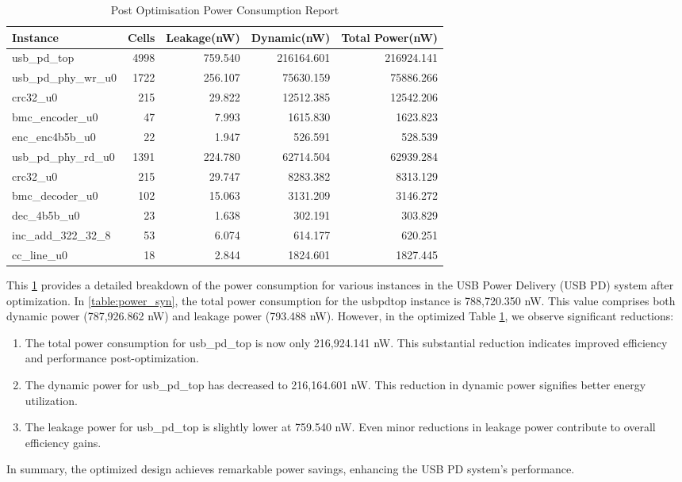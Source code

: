 \begin{table}[H]
\centering
\caption{Post Optimisation Power Consumption Report}
\begin{tabular}{|l|r|r|r|r|}
\hline
\textbf{Instance} & \textbf{Cells} & \textbf{Leakage(nW)} & \textbf{Dynamic(nW)} & \textbf{Total Power(nW)} \\ \hline
usb\_pd\_top & 4998 & 759.540 & 216164.601 & 216924.141 \\ \hline
\quad usb\_pd\_phy\_wr\_u0 & 1722 & 256.107 & 75630.159 & 75886.266 \\ \hline
\quad \quad crc32\_u0 & 215 & 29.822 & 12512.385 & 12542.206 \\ \hline
\quad \quad bmc\_encoder\_u0 & 47 & 7.993 & 1615.830 & 1623.823 \\ \hline
\quad \quad enc\_enc4b5b\_u0 & 22 & 1.947 & 526.591 & 528.539 \\ \hline
\quad usb\_pd\_phy\_rd\_u0 & 1391 & 224.780 & 62714.504 & 62939.284 \\ \hline
\quad \quad crc32\_u0 & 215 & 29.747 & 8283.382 & 8313.129 \\ \hline
\quad \quad bmc\_decoder\_u0 & 102 & 15.063 & 3131.209 & 3146.272 \\ \hline
\quad \quad dec\_4b5b\_u0 & 23 & 1.638 & 302.191 & 303.829 \\ \hline
inc\_add\_322\_32\_8 & 53 & 6.074 & 614.177 & 620.251 \\ \hline
cc\_line\_u0 & 18 & 2.844 & 1824.601 & 1827.445 \\ \hline
\end{tabular}
\label{table:power_opt}
\end{table}

This \ref{table:power_opt} provides a detailed breakdown of the power consumption for various instances in the USB Power Delivery (USB PD) system after optimization. In \ref{table:power_syn}, the total power consumption for the usbpdtop instance is 788,720.350 nW. This value comprises both dynamic power (787,926.862 nW) and leakage power (793.488 nW). However, in the optimized Table \ref{table:power_opt}, we observe significant reductions:

\begin{enumerate}
    \item The total power consumption for usb\_pd\_top is now only 216,924.141 nW. This substantial reduction indicates improved efficiency and performance post-optimization.
    \item The dynamic power for usb\_pd\_top has decreased to 216,164.601 nW. This reduction in dynamic power signifies better energy utilization.
    \item The leakage power for usb\_pd\_top is slightly lower at 759.540 nW. Even minor reductions in leakage power contribute to overall efficiency gains.
\end{enumerate}
In summary, the optimized design achieves remarkable power savings, enhancing the USB PD system’s performance.



